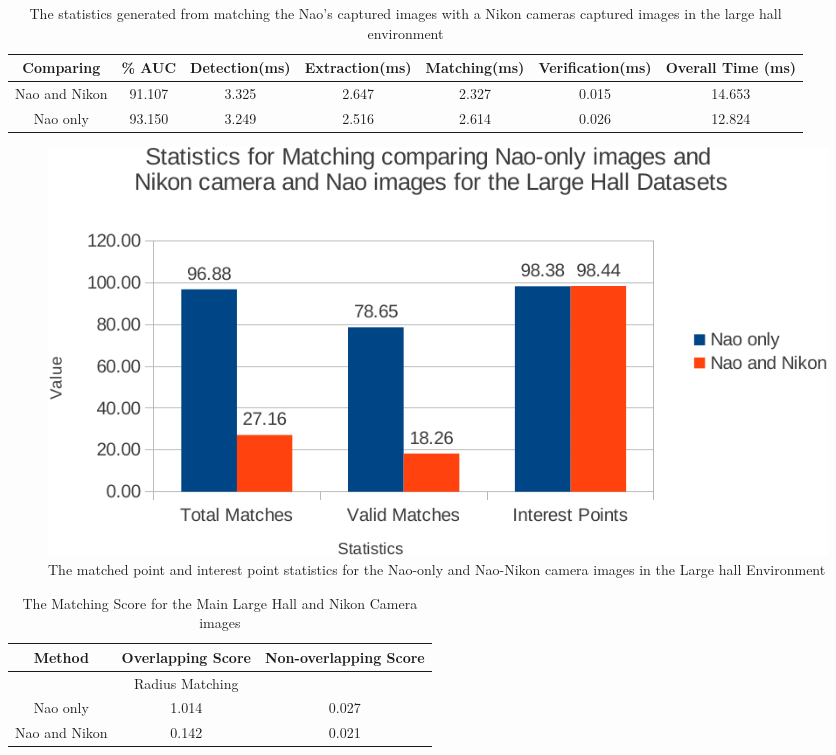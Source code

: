 \documentclass{report}
\begin{document}
\begin{table}
\caption{The statistics generated from matching the Nao's captured images with
a Nikon cameras captured images in the large hall environment}
\begin{tabular}{|c|c|c|c|c|c|c|}
\hline 
Comparing & \% AUC & Detection(ms) & Extraction(ms) & Matching(ms) & Verification(ms) & Overall Time (ms)\tabularnewline
\hline 
\hline 
Nao and Nikon & 91.107 & 3.325 & 2.647 & 2.327 & 0.015 & 14.653\tabularnewline
\hline 
Nao only & 93.150 & 3.249 & 2.516 & 2.614 & 0.026 & 12.824\tabularnewline
\hline 
\end{tabular}
\label{tab:naoNikonLargeHall}
\end{table}

\begin{figure}[h!] 
  \centering
    \includegraphics[width=1.0\textwidth]{../Drawings/Graphs/nikon_lh_matches_keypoints.pdf}
    \caption{The matched point and interest point statistics for the Nao-only and Nao-Nikon camera images in the Large hall Environment}
    \label{fig:nikon_lh_matches_keypoints}
\end{figure}


\begin{table}
\caption{The Matching Score for the Main Large Hall and Nikon Camera images}
\begin{tabular}{|c|c|c|}
\hline 
Method & Overlapping Score & Non-overlapping Score\tabularnewline
\hline 
\hline 
 & Radius Matching & \tabularnewline
\hline 
Nao only & 1.014 & 0.027\tabularnewline
\hline 
Nao and Nikon & 0.142 & 0.021\tabularnewline
\hline 
\end{tabular}
\label{tab:nklhMS}
\end{table}
\end{document}
